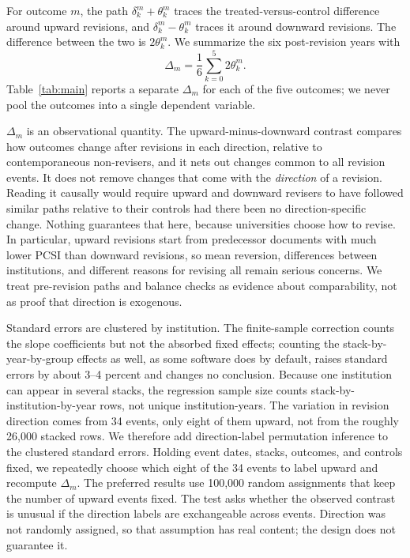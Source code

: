 For outcome $m$, the path $\delta^{m}_k+\theta^{m}_k$ traces the treated-versus-control difference around upward revisions, and $\delta^{m}_k-\theta^{m}_k$ traces it around downward revisions. The difference between the two is $2\theta^{m}_k$. We summarize the six post-revision years with
\begin{equation}
\Delta_m=\frac{1}{6}\sum_{k=0}^{5}2\theta^{m}_k.
\label{eq:delta}
\end{equation}
Table~\ref{tab:main} reports a separate $\Delta_m$ for each of the five outcomes; we never pool the outcomes into a single dependent variable.

$\Delta_m$ is an observational quantity. The upward-minus-downward contrast compares how outcomes change after revisions in each direction, relative to contemporaneous non-revisers, and it nets out changes common to all revision events. It does not remove changes that come with the \emph{direction} of a revision. Reading it causally would require upward and downward revisers to have followed similar paths relative to their controls had there been no direction-specific change. Nothing guarantees that here, because universities choose how to revise. In particular, upward revisions start from predecessor documents with much lower PCSI than downward revisions, so mean reversion, differences between institutions, and different reasons for revising all remain serious concerns. We treat pre-revision paths and balance checks as evidence about comparability, not as proof that direction is exogenous.

Standard errors are clustered by institution. The finite-sample correction counts the slope coefficients but not the absorbed fixed effects; counting the stack-by-year-by-group effects as well, as some software does by default, raises standard errors by about 3--4 percent and changes no conclusion. Because one institution can appear in several stacks, the regression sample size counts stack-by-institution-by-year rows, not unique institution-years. The variation in revision direction comes from 34 events, only eight of them upward, not from the roughly 26,000 stacked rows. We therefore add direction-label permutation inference to the clustered standard errors. Holding event dates, stacks, outcomes, and controls fixed, we repeatedly choose which eight of the 34 events to label upward and recompute $\Delta_m$. The preferred results use 100,000 random assignments that keep the number of upward events fixed. The test asks whether the observed contrast is unusual if the direction labels are exchangeable across events. Direction was not randomly assigned, so that assumption has real content; the design does not guarantee it.

